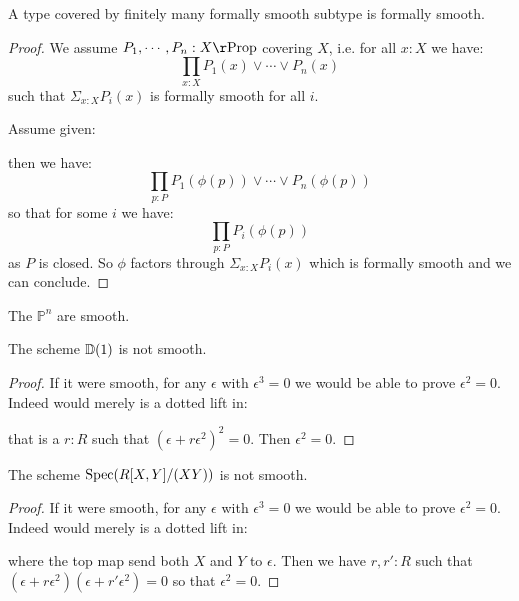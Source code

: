 \begin{lemma}
A type covered by finitely many formally smooth subtype is formally smooth.
\end{lemma}
\begin{proof}
We assume $P_1,\cdots,P_n:X\r \Prop$ covering $X$, i.e. for all $x:X$ we have:
\[
\prod_{x:X}P_1(x)\lor\cdots\lor P_n(x)
\]
such that $\Sigma_{x:X}P_i(x)$ is formally smooth for all $i$.

Assume given:
   \begin{center}
    \end{center}
   then we have:
   \[\prod_{p:P} P_1(\phi(p))\lor\cdots\lor P_n(\phi(p))\]
   so that for some $i$ we have:
      \[\prod_{p:P} P_i(\phi(p))\]
as $P$ is closed. So $\phi$ factors through $\Sigma_{x:X}P_i(x)$ which is formally smooth and we can conclude. %
\end{proof}

\begin{corollary}
The $\mathbb{P}^n$ are smooth.
\end{corollary}

\begin{lemma}
The scheme $\mathbb{D}(1)$ is not smooth.
\end{lemma}

\begin{proof}
If it were smooth, for any $\epsilon$ with $\epsilon^3=0$ we would be able to prove $\epsilon^2=0$. Indeed would merely is a dotted lift in:
 \begin{center}
    \end{center}
    that is a $r:R$ such that $(\epsilon+r\epsilon^2)^2=0$. Then $\epsilon^2=0$.
\end{proof}

\begin{lemma}
The scheme $\operatorname{Spec}(R[X,Y]/(XY))$ is not smooth.
\end{lemma}

\begin{proof}
If it were smooth, for any $\epsilon$ with $\epsilon^3=0$ we would be able to prove $\epsilon^2=0$. Indeed would merely is a dotted lift in:
 \begin{center}
    \end{center}
    where the top map send both $X$ and $Y$ to $\epsilon$. Then we have $r,r':R$ such that $(\epsilon+r\epsilon^2)(\epsilon+r'\epsilon^2)=0$ so that $\epsilon^2=0$. %
\end{proof}

